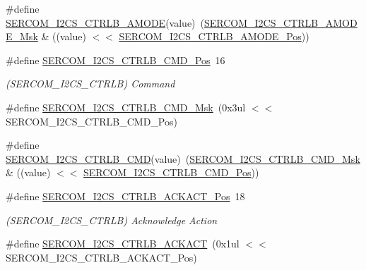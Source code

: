 \begin{DoxyCompactItemize}
\item 
\#define \mbox{\hyperlink{group___s_a_m_d21___s_e_r_c_o_m_ga85f510bf071c4a3dafded993643723df}{S\+E\+R\+C\+O\+M\+\_\+\+I2\+C\+S\+\_\+\+C\+T\+R\+L\+B\+\_\+\+A\+M\+O\+DE}}(value)~(\mbox{\hyperlink{group___s_a_m_d21___s_e_r_c_o_m_ga9154dde04914e1c9f121674eb49306eb}{S\+E\+R\+C\+O\+M\+\_\+\+I2\+C\+S\+\_\+\+C\+T\+R\+L\+B\+\_\+\+A\+M\+O\+D\+E\+\_\+\+Msk}} \& ((value) $<$$<$ \mbox{\hyperlink{group___s_a_m_d21___s_e_r_c_o_m_ga3a2e9eb3ba2460c2e89a056f56b5e0d4}{S\+E\+R\+C\+O\+M\+\_\+\+I2\+C\+S\+\_\+\+C\+T\+R\+L\+B\+\_\+\+A\+M\+O\+D\+E\+\_\+\+Pos}}))
\item 
\#define \mbox{\hyperlink{group___s_a_m_d21___s_e_r_c_o_m_gaa6604f85f8a3308c088213612f5252b5}{S\+E\+R\+C\+O\+M\+\_\+\+I2\+C\+S\+\_\+\+C\+T\+R\+L\+B\+\_\+\+C\+M\+D\+\_\+\+Pos}}~16
\begin{DoxyCompactList}\small\item\em (S\+E\+R\+C\+O\+M\+\_\+\+I2\+C\+S\+\_\+\+C\+T\+R\+LB) Command \end{DoxyCompactList}\item 
\#define \mbox{\hyperlink{group___s_a_m_d21___s_e_r_c_o_m_gad7742017a0e0854a58c01dae3bcf6226}{S\+E\+R\+C\+O\+M\+\_\+\+I2\+C\+S\+\_\+\+C\+T\+R\+L\+B\+\_\+\+C\+M\+D\+\_\+\+Msk}}~(0x3ul $<$$<$ S\+E\+R\+C\+O\+M\+\_\+\+I2\+C\+S\+\_\+\+C\+T\+R\+L\+B\+\_\+\+C\+M\+D\+\_\+\+Pos)
\item 
\#define \mbox{\hyperlink{group___s_a_m_d21___s_e_r_c_o_m_gab8628d7e683e6d9a7be7022c155934e7}{S\+E\+R\+C\+O\+M\+\_\+\+I2\+C\+S\+\_\+\+C\+T\+R\+L\+B\+\_\+\+C\+MD}}(value)~(\mbox{\hyperlink{group___s_a_m_d21___s_e_r_c_o_m_gad7742017a0e0854a58c01dae3bcf6226}{S\+E\+R\+C\+O\+M\+\_\+\+I2\+C\+S\+\_\+\+C\+T\+R\+L\+B\+\_\+\+C\+M\+D\+\_\+\+Msk}} \& ((value) $<$$<$ \mbox{\hyperlink{group___s_a_m_d21___s_e_r_c_o_m_gaa6604f85f8a3308c088213612f5252b5}{S\+E\+R\+C\+O\+M\+\_\+\+I2\+C\+S\+\_\+\+C\+T\+R\+L\+B\+\_\+\+C\+M\+D\+\_\+\+Pos}}))
\item 
\#define \mbox{\hyperlink{group___s_a_m_d21___s_e_r_c_o_m_ga9a5be18c7e0c42dc20a693178c2912e2}{S\+E\+R\+C\+O\+M\+\_\+\+I2\+C\+S\+\_\+\+C\+T\+R\+L\+B\+\_\+\+A\+C\+K\+A\+C\+T\+\_\+\+Pos}}~18
\begin{DoxyCompactList}\small\item\em (S\+E\+R\+C\+O\+M\+\_\+\+I2\+C\+S\+\_\+\+C\+T\+R\+LB) Acknowledge Action \end{DoxyCompactList}\item 
\#define \mbox{\hyperlink{group___s_a_m_d21___s_e_r_c_o_m_ga889f643cb96a7c2ce9eaa1fe3ac06a04}{S\+E\+R\+C\+O\+M\+\_\+\+I2\+C\+S\+\_\+\+C\+T\+R\+L\+B\+\_\+\+A\+C\+K\+A\+CT}}~(0x1ul $<$$<$ S\+E\+R\+C\+O\+M\+\_\+\+I2\+C\+S\+\_\+\+C\+T\+R\+L\+B\+\_\+\+A\+C\+K\+A\+C\+T\+\_\+\+Pos)

\end{DoxyCompactItemize}
